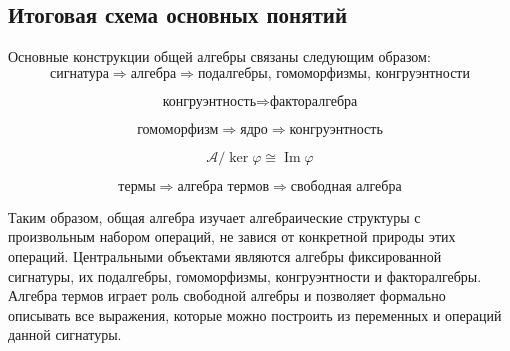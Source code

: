 \documentclass[12pt,a4paper]{article}
\begin{document}
\subsection{Итоговая схема основных понятий}

Основные конструкции общей алгебры связаны следующим образом:
\[
\boxed{
\text{сигнатура}
\Rightarrow
\text{алгебра}
\Rightarrow
\text{подалгебры, гомоморфизмы, конгруэнтности}
}
\]

\[
\boxed{
\text{конгруэнтность}
\Rightarrow
\text{факторалгебра}
}
\]

\[
\boxed{
\text{гомоморфизм}
\Rightarrow
\text{ядро}
\Rightarrow
\text{конгруэнтность}
}
\]

\[
\boxed{
\mathcal A/\ker\varphi\cong\operatorname{Im}\varphi
}
\]

\[
\boxed{
\text{термы}
\Rightarrow
\text{алгебра термов}
\Rightarrow
\text{свободная алгебра}
}
\]

Таким образом, общая алгебра изучает алгебраические структуры с произвольным набором операций, не завися от конкретной природы этих операций. Центральными объектами являются алгебры фиксированной сигнатуры, их подалгебры, гомоморфизмы, конгруэнтности и факторалгебры. Алгебра термов играет роль свободной алгебры и позволяет формально описывать все выражения, которые можно построить из переменных и операций данной сигнатуры.
\end{document}
